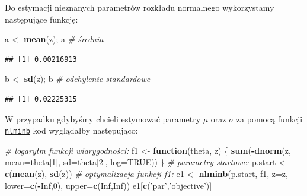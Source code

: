 \documentclass[polish,]{book}
\newenvironment{Shaded}{\begin{snugshade}}{\end{snugshade}}
\newcommand{\CommentTok}[1]{\textcolor[rgb]{0.56,0.35,0.01}{\textit{#1}}}
\newcommand{\ControlFlowTok}[1]{\textcolor[rgb]{0.13,0.29,0.53}{\textbf{#1}}}
\newcommand{\DataTypeTok}[1]{\textcolor[rgb]{0.13,0.29,0.53}{#1}}
\newcommand{\DecValTok}[1]{\textcolor[rgb]{0.00,0.00,0.81}{#1}}
\newcommand{\KeywordTok}[1]{\textcolor[rgb]{0.13,0.29,0.53}{\textbf{#1}}}
\newcommand{\NormalTok}[1]{#1}
\newcommand{\OperatorTok}[1]{\textcolor[rgb]{0.81,0.36,0.00}{\textbf{#1}}}
\newcommand{\OtherTok}[1]{\textcolor[rgb]{0.56,0.35,0.01}{#1}}
\newcommand{\StringTok}[1]{\textcolor[rgb]{0.31,0.60,0.02}{#1}}
\begin{document}
Do estymacji nieznanych parametrów rozkładu normalnego wykorzystamy następujące funkcję:

\begin{Shaded}
\begin{Highlighting}[]
\NormalTok{a <-}\StringTok{ }\KeywordTok{mean}\NormalTok{(z); a }\CommentTok{# średnia}
\end{Highlighting}
\end{Shaded}

\begin{verbatim}
## [1] 0.00216913
\end{verbatim}

\begin{Shaded}
\begin{Highlighting}[]
\NormalTok{b <-}\StringTok{ }\KeywordTok{sd}\NormalTok{(z); b   }\CommentTok{# odchylenie standardowe}
\end{Highlighting}
\end{Shaded}

\begin{verbatim}
## [1] 0.02225315
\end{verbatim}

W przypadku gdybyśmy chcieli estymować parametry \(\mu\) oraz \(\sigma\) za pomocą funkcji \href{https://rdrr.io/r/stats/nlminb.html}{\texttt{nlminb}} kod wyglądałby następująco:

\begin{Shaded}
\begin{Highlighting}[]
\CommentTok{# logarytm funkcji wiarygodności:}
\NormalTok{f1 <-}\StringTok{ }\ControlFlowTok{function}\NormalTok{(theta, z) \{}
  \KeywordTok{sum}\NormalTok{(}\OperatorTok{-}\KeywordTok{dnorm}\NormalTok{(z, }\DataTypeTok{mean=}\NormalTok{theta[}\DecValTok{1}\NormalTok{], }\DataTypeTok{sd=}\NormalTok{theta[}\DecValTok{2}\NormalTok{], }\DataTypeTok{log=}\OtherTok{TRUE}\NormalTok{))}
\NormalTok{  \}}
\CommentTok{# parametry startowe:}
\NormalTok{p.start <-}\StringTok{ }\KeywordTok{c}\NormalTok{(}\KeywordTok{mean}\NormalTok{(z), }\KeywordTok{sd}\NormalTok{(z))}
\CommentTok{# optymalizacja funkcji f1:}
\NormalTok{e1 <-}\StringTok{ }\KeywordTok{nlminb}\NormalTok{(p.start, f1, }\DataTypeTok{z=}\NormalTok{z, }\DataTypeTok{lower=}\KeywordTok{c}\NormalTok{(}\OperatorTok{-}\OtherTok{Inf}\NormalTok{,}\DecValTok{0}\NormalTok{), }\DataTypeTok{upper=}\KeywordTok{c}\NormalTok{(}\OtherTok{Inf}\NormalTok{,}\OtherTok{Inf}\NormalTok{))}
\NormalTok{e1[}\KeywordTok{c}\NormalTok{(}\StringTok{'par'}\NormalTok{,}\StringTok{'objective'}\NormalTok{)]}
\end{Highlighting}
\end{Shaded}
\end{document}
